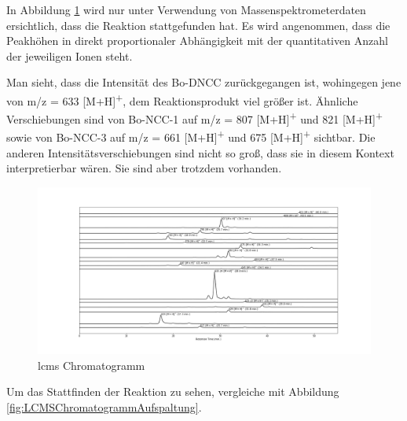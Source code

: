 In Abbildung \ref{fig:LCMSChromatogrammRPAufspaltung} wird nur unter Verwendung von Massenspektrometerdaten ersichtlich, dass die Reaktion stattgefunden hat. Es wird angenommen, dass die Peakhöhen in direkt proportionaler Abhängigkeit mit der quantitativen Anzahl der jeweiligen Ionen steht.

Man sieht, dass die Intensität des Bo-DNCC zurückgegangen ist, wohingegen jene von m/z = 633 [M+H]\textsuperscript{+}, dem Reaktionsprodukt viel größer ist. Ähnliche Verschiebungen sind von Bo-NCC-1 auf m/z = 807 [M+H]\textsuperscript{+} und 821 [M+H]\textsuperscript{+} sowie von Bo-NCC-3 auf m/z = 661 [M+H]\textsuperscript{+} und 675 [M+H]\textsuperscript{+} sichtbar. Die anderen Intensitätsverschiebungen sind nicht so groß, dass sie in diesem Kontext interpretierbar wären. Sie sind aber trotzdem vorhanden.

\begin{figure}[!htbp]
  \centering
  \includegraphics[width=1.4\textwidth, center]{figures/Kapitel6/Reaktion3h/Kuerbis_Analyse_Reaktion3h_LC-ESI-MS.png}
  \caption[LC-MS Chromatogramm nach 3 h Reaktionsdauer - Aufspaltung, Quelle: Autor]{\gls{lcms} Chromatogramm}
  \label{fig:LCMSChromatogrammRPAufspaltung}
\end{figure}

Um das Stattfinden der Reaktion zu sehen, vergleiche mit Abbildung \ref{fig:LCMSChromatogrammAufspaltung}.

